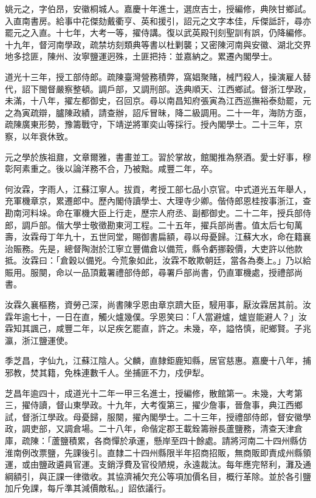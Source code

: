 \begin{pinyinscope}
姚元之，字伯昂，安徽桐城人。嘉慶十年進士，選庶吉士，授編修，典陜甘鄉試。入直南書房。給事中花傑劾戴衢亨、英和援引，詔元之文字本佳，斥傑詆訐，尋亦罷元之入直。十七年，大考一等，擢侍講。復以武英殿刊刻聖訓有誤，仍降編修。十九年，督河南學政，疏禁坊刻類典等書以杜剿襲；又密陳河南與安徽、湖北交界地多捻匪，陳州、汝寧鹽運迥殊，土匪把持：並嘉納之。累遷內閣學士。

道光十三年，授工部侍郎。疏陳臺灣營務積弊，窩娼聚賭，械鬥殺人，操演雇人替代，詔下閩督嚴察整頓。調戶部，又調刑部。迭典順天、江西鄉試。督浙江學政，未滿，十八年，擢左都御史，召回京。尋以南昌知府張寅為江西巡撫裕泰劾罷，元之為寅疏辯，臚陳政績，請查辦，詔斥冒昧，降二級調用。二十一年，海防方亟，疏陳廣東形勢，豫籌戰守，下靖逆將軍奕山等採行。授內閣學士。二十三年，京察，以年衰休致。

元之學於族祖鼐，文章爾雅，書畫並工。習於掌故，館閣推為祭酒。愛士好事，穆彰阿素重之。後以論洋務不合，乃被黜。咸豐二年，卒。

何汝霖，字雨人，江蘇江寧人。拔貢，考授工部七品小京官。中式道光五年舉人，充軍機章京，累遷郎中。歷內閣侍讀學士、大理寺少卿。偕侍郎恩桂按事浙江，查勘南河料垛。命在軍機大臣上行走，歷宗人府丞、副都御史。二十二年，授兵部侍郎，調戶部。偕大學士敬徵勘東河工程。二十五年，擢兵部尚書。值太后七旬萬壽，汝霖母丁年九十，五世同堂，賜御書扁額，尋以母憂歸。江蘇大水，命在籍襄治賑務。先是，總督陶澍於江寧立豐備倉以備荒，縣令虧挪穀價，大吏許以他款抵。汝霖曰：「倉穀以備兇。今荒象如此，汝霖不敢欺朝廷，當各為奏上。」乃以給賑用。服闋，命以一品頂戴署禮部侍郎，尋署戶部尚書，仍直軍機處，授禮部尚書。

汝霖久襄樞務，資勞己深，尚書陳孚恩由章京躋大臣，駸用事，厭汝霖居其前。汝霖年逾七十，一日在直，觸火爐幾僕。孚恩笑曰：「人當避爐，爐豈能避人？」汝霖知其諷己，咸豐二年，以足疾乞罷直，許之。未幾，卒，謚恪慎，祀鄉賢。子兆瀛，浙江鹽運使。

季芝昌，字仙九，江蘇江陰人。父麟，直隸鉅鹿知縣，居官慈惠。嘉慶十八年，捕邪教，焚其籍，免株連數千人。坐捕匪不力，戍伊犁。

芝昌年逾四十，成道光十二年一甲三名進士，授編修，散館第一。未幾，大考第三，擢侍讀，督山東學政。十九年，大考復第三，擢少詹事，晉詹事，典江西鄉試，督浙江學政。母憂歸，服闋，擢內閣學士。二十三年，授禮部侍郎，督安徽學政，調吏部，又調倉場。二十八年，命偕定郡王載銓籌辦長蘆鹽務，清查天津倉庫，疏陳：「蘆鹽積累，各商憚於承運，懸岸至四十餘處。請將河南二十四州縣仿淮南例改票鹽，先課後引。直隸二十四州縣限半年招商招販，無商販即責成州縣領運，或由鹽政遴員官運。支銷浮費及官役陋規，永遠裁汰。每年應完帑利，灘及通綱額引，與正課一律徵收。其協濟補欠充公等項加價名目，概行革除。並於各引鹽加斤免課，每斤準其減價敵私。」詔依議行。


\end{pinyinscope}

